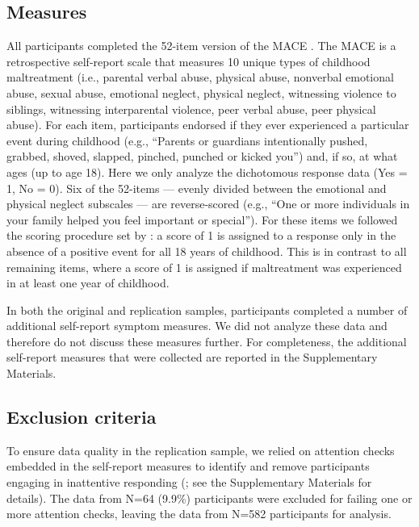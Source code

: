 \documentclass[letterpaper,man,natbib,longtable,floatsintext,12pt]{apa6}
\begin{document}
\subsection{Measures}

All participants completed the 52-item version of the MACE \citep{teicher2015maltreatment}. The MACE is a retrospective self-report scale that measures 10 unique types of childhood maltreatment (i.e., parental verbal abuse, physical abuse, nonverbal emotional abuse, sexual abuse, emotional neglect, physical neglect, witnessing violence to siblings, witnessing interparental violence, peer verbal abuse, peer physical abuse). For each item, participants endorsed if they ever experienced a particular event during childhood (e.g., ``Parents or guardians intentionally pushed, grabbed, shoved, slapped, pinched, punched or kicked you'') and, if so, at what ages (up to age 18). Here we only analyze the dichotomous response data (Yes = 1, No = 0). Six of the 52-items --- evenly divided between the emotional and physical neglect subscales --- are reverse-scored (e.g., ``One or more individuals in your family helped you feel important or special''). For these items we followed the scoring procedure set by \cite{teicher2015maltreatment}: a score of 1 is assigned to a response only in the absence of a positive event for all 18 years of childhood. This is in contrast to all remaining items, where a score of 1 is assigned if maltreatment was experienced in at least one year of childhood.

In both the original and replication samples, participants completed a number of additional self-report symptom measures. We did not analyze these data and therefore do not discuss these measures further. For completeness, the additional self-report measures that were collected are reported in the Supplementary Materials. 

\subsection{Exclusion criteria}

To ensure data quality in the replication sample, we relied on attention checks embedded in the self-report measures to identify and remove participants engaging in inattentive responding (\citealt{zorowitz2021inattentive}; see the Supplementary Materials for details). The data from N=64 (9.9\%) participants were excluded for failing one or more attention checks, leaving the data from N=582 participants for analysis.
\end{document}

